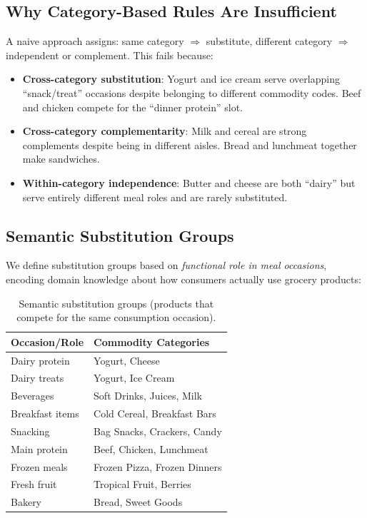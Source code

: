 \documentclass[11pt,a4paper]{article}
\begin{document}
\subsection{Why Category-Based Rules Are Insufficient}

A naive approach assigns: same category $\Rightarrow$ substitute, different category $\Rightarrow$ independent or complement.
This fails because:
\begin{itemize}
    \item \textbf{Cross-category substitution}: Yogurt and ice cream serve overlapping ``snack/treat'' occasions despite belonging to different commodity codes.
    Beef and chicken compete for the ``dinner protein'' slot.
    \item \textbf{Cross-category complementarity}: Milk and cereal are strong complements despite being in different aisles.
    Bread and lunchmeat together make sandwiches.
    \item \textbf{Within-category independence}: Butter and cheese are both ``dairy'' but serve entirely different meal roles and are rarely substituted.
\end{itemize}

\subsection{Semantic Substitution Groups}

We define substitution groups based on \emph{functional role in meal occasions}, encoding domain knowledge about how consumers actually use grocery products:

\begin{table}[H]
\centering
\caption{Semantic substitution groups (products that compete for the same consumption occasion).}
\begin{tabular}{@{}lp{8cm}@{}}
\toprule
\textbf{Occasion/Role} & \textbf{Commodity Categories} \\
\midrule
Dairy protein & Yogurt, Cheese \\
Dairy treats & Yogurt, Ice Cream \\
Beverages & Soft Drinks, Juices, Milk \\
Breakfast items & Cold Cereal, Breakfast Bars \\
Snacking & Bag Snacks, Crackers, Candy \\
Main protein & Beef, Chicken, Lunchmeat \\
Frozen meals & Frozen Pizza, Frozen Dinners \\
Fresh fruit & Tropical Fruit, Berries \\
Bakery & Bread, Sweet Goods \\
\bottomrule
\end{tabular}
\end{table}
\end{document}
